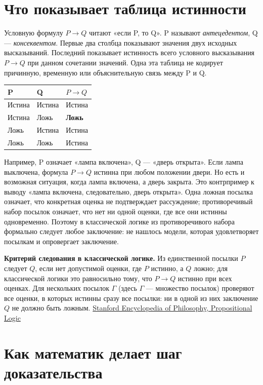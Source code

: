 \documentclass[12pt,a4paper]{article}
\begin{document}
\section{Что показывает таблица истинности}

Условную формулу \(P\to Q\) читают «если P, то Q». P называют \emph{антецедентом}, Q — \emph{консеквентом}. Первые два столбца показывают значения двух исходных высказываний. Последний показывает истинность всего условного высказывания \(P\to Q\) при данном сочетании значений. Одна эта таблица не кодирует причинную, временную или объяснительную связь между P и Q.

\begin{longtable}{P{.18\linewidth}P{.43\linewidth}P{.27\linewidth}}
\toprule
\textbf{P} & \textbf{Q} & \textbf{\(P\to Q\)} \\
\midrule
Истина & Истина & Истина \\
Истина & Ложь & \textbf{Ложь} \\
Ложь & Истина & Истина \\
Ложь & Ложь & Истина \\
\bottomrule
\end{longtable}

Например, P означает «лампа включена», Q — «дверь открыта». Если лампа выключена, формула \(P\to Q\) истинна при любом положении двери. Но есть и возможная ситуация, когда лампа включена, а дверь закрыта. Это контрпример к выводу «лампа включена, следовательно, дверь открыта». Одна ложная посылка означает, что конкретная оценка не подтверждает рассуждение; противоречивый набор посылок означает, что нет ни одной оценки, где все они истинны одновременно. Поэтому в классической логике из противоречивого набора формально следует любое заключение: не нашлось модели, которая удовлетворяет посылкам и опровергает заключение.

\textbf{Критерий следования в классической логике.} Из единственной посылки \(P\) следует \(Q\), если нет допустимой оценки, где \(P\) истинно, а \(Q\) ложно; для классической логики это равносильно тому, что \(P\to Q\) истинно при всех оценках. Для нескольких посылок \(\Gamma\) (здесь \(\Gamma\) — множество посылок) проверяют все оценки, в которых истинны сразу все посылки: ни в одной из них заключение \(Q\) не должно быть ложным. \href{https://plato.stanford.edu/entries/logic-propositional/}{Stanford Encyclopedia of Philosophy, Propositional Logic}

\section{Как математик делает шаг доказательства}
\end{document}
